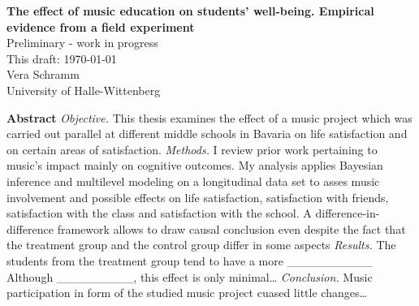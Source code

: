 \documentclass[a4, 12pt]{article}
\begin{document}
\begin{titlepage}
\thispagestyle{empty}%
\begin{center}
\renewcommand{\baselinestretch}{1.0}\normalsize %
\textbf{
The effect of music education on students' well-being. Empirical evidence from a field experiment}\\[1cm]
Preliminary - work in progress \\[1cm]
This draft: \today \\[1cm]
Vera Schramm \\
University of Halle-Wittenberg \\[0.75cm]
 \end{center}


\end{titlepage}

\setcounter{page}{2}

\renewcommand{\baselinestretch}{1}\normalsize

\textbf{\normalsize Abstract}
\emph{Objective.} This thesis examines the effect of a music project which was carried out parallel at different middle schools in Bavaria on life satisfaction and on certain areas of satisfaction. \emph{Methods.} I review prior work pertaining to music's impact mainly on cognitive outcomes. My analysis applies Bayesian inference and multilevel modeling on a longitudinal data set to asses music involvement and possible effects on life satisfaction, satisfaction with friends, satisfaction with the class and satisfaction with the school. A difference-in-difference framework allows to draw causal conclusion even despite the fact that the treatment group and the control group differ in some aspects \emph{Results.} The students from the treatment group tend to have a more \_\_\_\_\_\_\_\_\_\_ Although \_\_\_\_\_\_\_\_\_, this effect is only minimal\ldots{} \emph{Conclusion.} Music participation in form of the studied music project cuased little changes\ldots{}

\clearpage
\tableofcontents

\clearpage
\listoftables

\clearpage
\listoffigures

\clearpage
\doublespacing
\pagestyle{plain}
\end{document}

